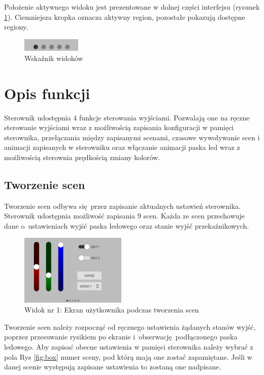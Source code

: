 \documentclass[12pt, eng, twoside, openany, final]{mgr}
\begin{document}
\noindent    Położenie aktywnego widoku jest prezentowane w dolnej części interfejsu (rysunek \ref{fig:ind}). Ciemniejsza kropka oznacza aktywny region, pozostałe pokazują dostępne regiony.
        \begin{figure}[H]
        \begin{center}
            \includegraphics[width=0.25\textwidth]{ui_pageind.jpg}
            \caption{Wskaźnik widoków}
            \label{fig:ind}
        \end{center}
        \end{figure}
    \newpage
    
    \section{Opis funkcji}
        Sterownik udostępnia 4 funkcje sterowania wyjściami. Pozwalają one na ręczne sterowanie wyjściami wraz z możliwością zapisania konfiguracji w pamięci sterownika, przełączania między zapisanymi scenami, czasowe wywoływanie scen i animacji zapisanych w sterowniku oraz włączanie animacji paska led wraz z możliwością sterownia prędkością zmiany kolorów.
        \subsection{Tworzenie scen}
        Tworzenie scen odbywa się przez zapisanie aktualnych ustawień sterownika. Sterownik udostępnia możliwość zapisania  9 scen. Każda ze scen przechowuje dane o~ustawieniach wyjść paska ledowego oraz stanie wyjść przekaźnikowych. 

            \begin{figure}[H]
            \begin{center}
                \includegraphics[width=0.45\textwidth]{ui_manualTab.jpg}
                \caption{Widok nr 1: Ekran użytkownika podczas tworzenia scen}
                \label{fig:view1}
            \end{center}
            \end{figure}
            \noindent Tworzenie scen należy rozpocząć od ręcznego ustawienia żądanych stanów wyjść, poprzez przesuwanie rysikiem po ekranie i~obserwację podłączonego paska ledowego. Aby zapisać obecne ustawienia w pamięci sterownika należy wybrać z pola Rys \ref{fig:box} numer sceny, pod którą mają one zostać zapamiętane. Jeśli w danej scenie występują zapisane ustawienia to zostaną one nadpisane.
            
\end{document}
